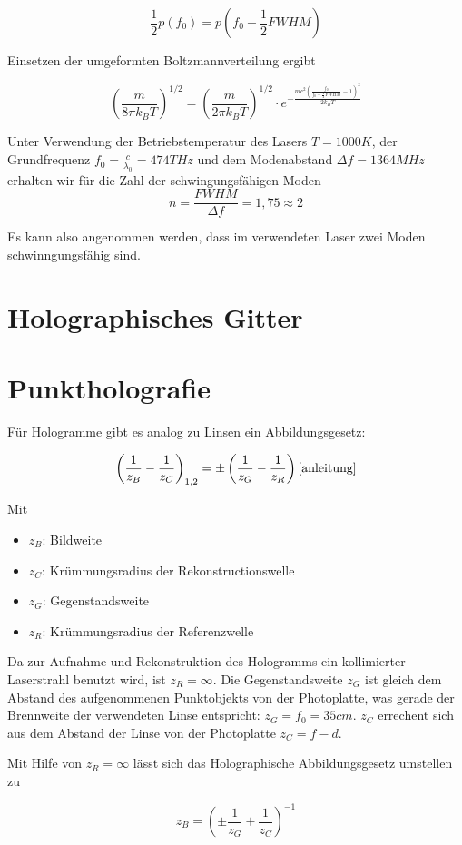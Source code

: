 \documentclass[bigchapter,colorback,accentcolor=tud4b,linedtoc,11pt]{tudreport}
\begin{document}
$$\frac{1}{2}p(f_0) = p(f_0 - \frac{1}{2} FWHM) $$

Einsetzen der umgeformten Boltzmannverteilung ergibt

$$\left(\frac{m}{8\pi k_B T}\right)^{1/2} = \left(\frac{m}{2\pi k_B
    T}\right)^{1/2} \cdot e^{-\frac{m c^2\left( \frac{f_0}{f_0 -
        \frac{1}{2}FWHM}-1 \right)^2}{2k_B T}}$$

Unter Verwendung der Betriebstemperatur des Lasers $T = 1000K$, der
Grundfrequenz $f_0 = \frac{c}{\lambda_0} = 474THz$ und dem Modenabstand $\Delta
f = 1364MHz$ erhalten wir für die Zahl der schwingungsfähigen Moden
$$n = \frac{FWHM}{\Delta f} = 1,75 \approx 2$$

Es kann also angenommen werden, dass im verwendeten Laser zwei Moden
schwinngungsfähig sind.


\section{Holographisches Gitter}

\section{Punktholografie}

Für Hologramme gibt es analog zu Linsen ein Abbildungsgesetz:

$$\left( \frac{1}{z_B} -\frac{1}{z_C} \right)_{1,2} = \pm \left( \frac{1}{z_G}
  -\frac{1}{z_R} \right) \cite{anleitung}$$

Mit 
\begin{itemize}
  \item $z_B$: Bildweite
  \item $z_C$: Krümmungsradius der Rekonstructionswelle
  \item $z_G$: Gegenstandsweite
  \item $z_R$: Krümmungsradius der Referenzwelle
\end{itemize}
Da zur Aufnahme und Rekonstruktion des Hologramms ein kollimierter Laserstrahl
benutzt wird, ist $z_R = \infty$. Die Gegenstandsweite $z_G$ ist gleich dem
Abstand des aufgenommenen Punktobjekts von der Photoplatte, was gerade der
Brennweite der verwendeten Linse entspricht: $z_G = f_0 = 35cm$. $z_C$ errechent
sich aus dem Abstand der Linse von der Photoplatte $z_C = f - d$.

Mit Hilfe von $z_R = \infty$ lässt sich das Holographische Abbildungsgesetz
umstellen zu 

$$z_B = \left(\pm\frac{1}{z_G}+\frac{1}{z_C}\right)^{-1}$$
\end{document}

